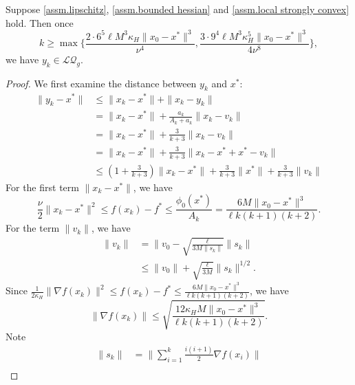 \documentclass{article}
\begin{document}
\begin{lemma}
    Suppose \autoref{assm.lipschitz}, \autoref{assm.bounded hessian} and \autoref{assm.local strongly convex} hold. Then once 
    \begin{equation*}
        k\geq \max\{\frac{2\cdot6^5\ell M^3\kappa_H\|x_0-x^*\|^3}{\nu^4},\frac{3\cdot9^4\ell M^3\kappa_H^5\|x_0-x^*\|^3}{4\nu^8}\},
    \end{equation*}
    we have $y_k\in \mathcal{LQ}_g$.
\end{lemma}
\begin{proof}
    We first examine the distance between $y_k$ and $x^*$:
    \begin{equation*}
        \begin{aligned}
            \|y_k-x^*\| &\leq \|x_k-x^*\|+\|x_k-y_k\|\\
            &=\|x_k-x^*\|+\frac{a_k}{A_k+a_k}\|x_k-v_k\|\\
            &= \|x_k-x^*\|+\frac{3}{k+3}\|x_k-v_k\|\\
            &=\|x_k-x^*\|+\frac{3}{k+3}\|x_k-x^*+x^*-v_k\|\\
            &\leq (1+\frac{3}{k+3})\|x_k-x^*\|+\frac{3}{k+3}\|x^*\|+\frac{3}{k+3}\|v_k\|
        \end{aligned}
    \end{equation*}
    For the first term $\|x_k-x^*\|$, we have
    \begin{equation*}
        \frac{\nu}{2}\|x_k-x^*\|^2 \leq f(x_k)-f^* \leq \frac{\phi_0(x^*)}{A_k}=\frac{6M\|x_0-x^*\|^3}{\ell k(k+1)(k+2)}.
    \end{equation*}
    For the term $\|v_k\|$, we have
    \begin{equation*}
        \begin{aligned}
            \|v_k\|&=\|v_0-\sqrt{\frac{\ell}{3M\|s_{k}\|}}\|s_k\|\\
            &\leq \|v_0\|+\sqrt{\frac{\ell}{3M}}\|s_k\|^{1/2}.
        \end{aligned}
    \end{equation*}
    Since $\frac{1}{2\kappa_H}\|\nabla f(x_k)\|^2 \leq f(x_k)-f^* \leq \frac{6M\|x_0-x^*\|^3}{\ell k(k+1)(k+2)}$, we have
    \begin{equation*}
        \|\nabla f(x_k)\|\leq \sqrt{\frac{12\kappa_H M\|x_0-x^*\|^3}{\ell k(k+1)(k+2)}}.
    \end{equation*}
    Note
    \begin{equation*}
        \begin{aligned}
            \|s_k\|&=\|\sum_{i=1}^k\frac{i(i+1)}{2}\nabla f(x_i)\|\\

\end{aligned}
\end{equation*}
\end{proof}
\end{document}
